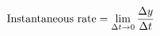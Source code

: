 \documentclass[preview]{standalone}
\begin{document}
\begin{align*}
\special{dvisvgm:raw <g id='unique000'>}\text{Instantaneous rate}=\lim_{\Delta t\to 0}\frac{\Delta y}{\Delta t}\special{dvisvgm:raw </g>}
\end{align*}
\end{document}
